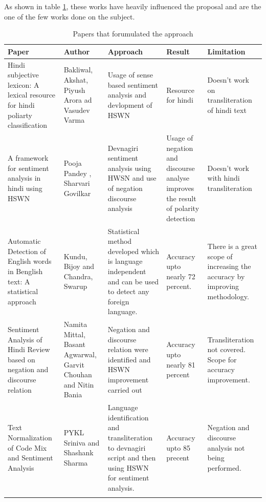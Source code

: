 \documentclass[12pt]{book}
\begin{document}
As shown in table \ref{tab:tab1}, these works have heavily
influenced the proposal and are the one of the few works done on the subject.\\

\begin{longtable}[c]{ |p{3cm}|p{3cm}|p{3cm}|p{3cm}|p{3cm}|  }
  \hline
  Paper & Author & Approach & Result & Limitation\\
  \hline
  \endhead
  Hindi subjective lexicon: A lexical resource for hindi poliarty
  classification \cite{bakliwal_hindi_2012} & Bakliwal, Akshat, Piyush Arora ad Vasudev Varma & Usage of
  sense based sentiment analysis and devlopment of HSWN& Resource for hindi &
  Doesn't work on transliteration of hindi text\\ 
  \hline
  A framework for sentiment analysis in hindi using HSWN
  \cite{pandey_framework_2015} & Pooja Pandey , Sharvari Govilkar & Devnagiri
  sentiment analysis using HWSN
  and use of negation discourse analysis & Usage of negation and discourse
  analyse improves the result of polarity detection & Doesn't work with hindi
  transliteration\\
  \hline
  Automatic Detection of English words in Benglish text: A statistical approach
  \cite{kundu_automatic_2012} & Kundu, Bijoy and Chandra, Swarup & Statistical
  method developed which is language independent and can be used to detect any
  foreign language. & Accuracy upto nearly 72 percent. & There is a great scope
  of increasing the accuracy by improving methodology.\\
  \hline
  Sentiment Analysis of Hindi Review based on negation and discourse relation
  \cite{mittal_sentiment_2013} & Namita Mittal, Basant Agwarwal, Garvit Chouhan
  and Nitin Bania & Negation and discourse relation were identified and HSWN
  improvement carried out & Accuracy upto nearly 81 percent & Transliteration
  not covered. Scope for accuracy improvement.\\
  \hline
  Text Normalization of Code Mix and Sentiment Analysis \cite{sharma_text_2015} & PYKL Sriniva and
  Shashank Sharma & Language identification and transliteration to devnagiri
  script and then using HSWN for sentiment analysis.& Accuracy upto 85 precent
  & Negation and discourse analysis not being performed. \\ 
  \hline

  \caption{Papers that forumulated the approach}\label{tab:tab1}\\
\end{longtable}
\end{document}
